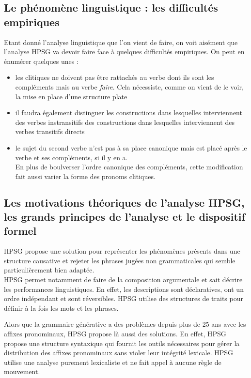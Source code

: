 \subsection{Le phénomène linguistique : les difficultés empiriques}

Etant donné l'analyse linguistique que l'on vient de faire, on voit aisément que l'analyse HPSG va devoir faire face à quelques difficultés empiriques.
On peut en énumérer quelques unes :\\

\begin{itemize}
  \item les clitiques ne doivent pas être rattachés au verbe dont ils sont les compléments mais au verbe \emph{faire}.
    Cela nécessiste, comme on vient de le voir, la mise en place d'une structure plate
  \item il faudra également distinguer les constructions dans lesquelles interviennent des verbes instransitifs des constructions dans lesquelles interviennent des verbes transitifs directs
  \item le sujet du second verbe n'est pas à sa place canonique mais est placé après le verbe et ses compléments, si il y en a.\\
    En plus de boulverser l'ordre canonique des compléments, cette modification fait aussi varier la forme des pronoms clitiques.
\end{itemize}


\subsection{Les motivations théoriques de l'analyse HPSG, les grands principes de l'analyse et le dispositif formel}

HPSG propose une solution pour représenter les phénomènes présents dans une structure causative et rejeter les phrases jugées non grammaticales qui semble particulièrement bien adaptée.\\

HPSG permet notamment de faire de la composition argumentale et sait décrire les performances linguistiques.
En effet, les descriptions sont déclaratives, ont un ordre indépendant et sont réversibles.
HPSG utilise des structures de traits pour définir à la fois les mots et les phrases.

Alors que la grammaire générative a des problèmes depuis plus de 25 ans avec les affixes pronominaux, HPSG propose là aussi des solutions.
En effet, HPSG propose une structure syntaxique qui fournit les outils nécessaires pour gérer la distribution des affixes pronominaux sans violer leur intégrité lexicale.
HPSG utilise une analyse purement lexicaliste et ne fait appel à aucune règle de mouvement.\\

